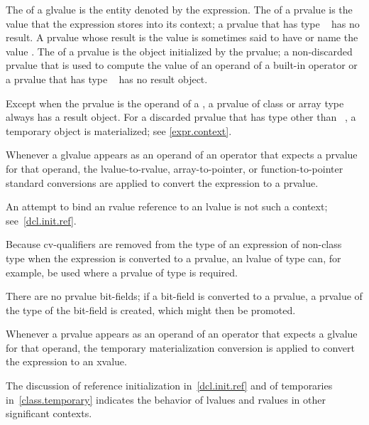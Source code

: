 \pnum
The  of a glvalue is the entity denoted by the expression.
The  of a prvalue
is the value that the expression stores into its context;
a prvalue that has type \cv{}~ has no result.
A prvalue whose result is the value 
is sometimes said to have or name the value .
The  of a prvalue is the object initialized by the prvalue;
a non-discarded prvalue
that is used to compute the value of an operand of a built-in operator
or a prvalue that has type \cv{}~
has no result object.
\begin{note}
Except when the prvalue is the operand of a ,
a prvalue of class or array type always has a result object.
For a discarded prvalue that has type other than \cv{}~,
a temporary object is materialized; see \ref{expr.context}.
\end{note}

\pnum
Whenever a glvalue appears as an operand of an operator that
expects a prvalue for that operand, the
lvalue-to-rvalue, array-to-pointer,
or function-to-pointer standard conversions are
applied to convert the expression to a prvalue.
\begin{note}
An attempt to bind an rvalue reference to an lvalue is not such a context; see~\ref{dcl.init.ref}.
\end{note}
\begin{note}
Because cv-qualifiers are removed from the type of an expression of
non-class type when the expression is converted to a prvalue, an lvalue
of type  can, for example, be used where
a prvalue of type  is required.
\end{note}
\begin{note}
There are no prvalue bit-fields; if a bit-field is converted to a
prvalue, a prvalue of the type of the bit-field is
created, which might then be promoted.
\end{note}

\pnum
Whenever a prvalue appears as an operand of an operator that
expects a glvalue for that operand, the
temporary materialization conversion is
applied to convert the expression to an xvalue.

\pnum
The discussion of reference initialization in~\ref{dcl.init.ref} and of
temporaries in~\ref{class.temporary} indicates the behavior of lvalues
and rvalues in other significant contexts.

